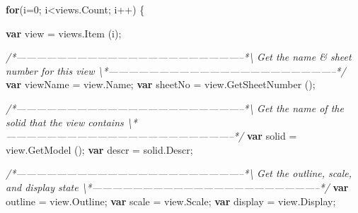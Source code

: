 \documentclass[]{article}
\newenvironment{Shaded}{}{}
\newcommand{\KeywordTok}[1]{\textcolor[rgb]{0.00,0.44,0.13}{\textbf{{#1}}}}
\newcommand{\DecValTok}[1]{\textcolor[rgb]{0.25,0.63,0.44}{{#1}}}
\newcommand{\CommentTok}[1]{\textcolor[rgb]{0.38,0.63,0.69}{\textit{{#1}}}}
\newcommand{\OtherTok}[1]{\textcolor[rgb]{0.00,0.44,0.13}{{#1}}}
\newcommand{\FunctionTok}[1]{\textcolor[rgb]{0.02,0.16,0.49}{{#1}}}
\newcommand{\NormalTok}[1]{{#1}}
\begin{document}
\begin{Shaded}
\begin{Highlighting}[]
  \KeywordTok{for}\NormalTok{(i=}\DecValTok{0}\NormalTok{; i<}\OtherTok{views}\NormalTok{.}\FunctionTok{Count}\NormalTok{; i++)}
    \NormalTok{\{ }
      
      \KeywordTok{var} \NormalTok{view = }\OtherTok{views}\NormalTok{.}\FunctionTok{Item} \NormalTok{(i);}

\CommentTok{/*--------------------------------------------------------------------*\textbackslash{} }
\CommentTok{  Get the name & sheet number for this view}
\CommentTok{\textbackslash{}*--------------------------------------------------------------------*/}
      \KeywordTok{var} \NormalTok{viewName = }\OtherTok{view}\NormalTok{.}\FunctionTok{Name}\NormalTok{;}
      \KeywordTok{var} \NormalTok{sheetNo = }\OtherTok{view}\NormalTok{.}\FunctionTok{GetSheetNumber} \NormalTok{();}

\CommentTok{/*--------------------------------------------------------------------*\textbackslash{} }
\CommentTok{  Get the name of the solid that the view contains}
\CommentTok{\textbackslash{}*--------------------------------------------------------------------*/} 
      \KeywordTok{var} \NormalTok{solid  = }\OtherTok{view}\NormalTok{.}\FunctionTok{GetModel} \NormalTok{();}
      \KeywordTok{var} \NormalTok{descr = }\OtherTok{solid}\NormalTok{.}\FunctionTok{Descr}\NormalTok{;}
      
\CommentTok{/*--------------------------------------------------------------------*\textbackslash{}  }
\CommentTok{  Get the outline, scale, and display state}
\CommentTok{\textbackslash{}*--------------------------------------------------------------------*/} 
      \KeywordTok{var} \NormalTok{outline = }\OtherTok{view}\NormalTok{.}\FunctionTok{Outline}\NormalTok{;}
      \KeywordTok{var} \NormalTok{scale = }\OtherTok{view}\NormalTok{.}\FunctionTok{Scale}\NormalTok{;}
      \KeywordTok{var} \NormalTok{display = }\OtherTok{view}\NormalTok{.}\FunctionTok{Display}\NormalTok{;}
    

\end{Highlighting}
\end{Shaded}
\end{document}
